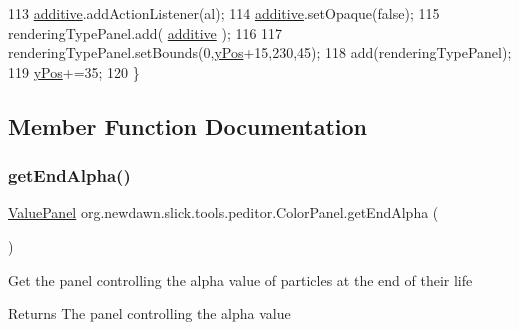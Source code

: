 \begin{DoxyCode}
113         \mbox{\hyperlink{classorg_1_1newdawn_1_1slick_1_1tools_1_1peditor_1_1_color_panel_a538f6d62e19f00dbbb4bed362005f783}{additive}}.addActionListener(al);
114         \mbox{\hyperlink{classorg_1_1newdawn_1_1slick_1_1tools_1_1peditor_1_1_color_panel_a538f6d62e19f00dbbb4bed362005f783}{additive}}.setOpaque(\textcolor{keyword}{false});
115         renderingTypePanel.add( \mbox{\hyperlink{classorg_1_1newdawn_1_1slick_1_1tools_1_1peditor_1_1_color_panel_a538f6d62e19f00dbbb4bed362005f783}{additive}} );
116         
117         renderingTypePanel.setBounds(0,\mbox{\hyperlink{classorg_1_1newdawn_1_1slick_1_1tools_1_1peditor_1_1_control_panel_a3d5996be7856b645ae7a1288ce688623}{yPos}}+15,230,45);
118         add(renderingTypePanel);
119         \mbox{\hyperlink{classorg_1_1newdawn_1_1slick_1_1tools_1_1peditor_1_1_control_panel_a3d5996be7856b645ae7a1288ce688623}{yPos}}+=35;
120     \}
\end{DoxyCode}


\subsection{Member Function Documentation}
\mbox{\label{classorg_1_1newdawn_1_1slick_1_1tools_1_1peditor_1_1_color_panel_a98d17b9376493d11742c2365b25d8114}} 
\subsubsection{\texorpdfstring{get\+End\+Alpha()}{getEndAlpha()}}
{\footnotesize\ttfamily \mbox{\hyperlink{classorg_1_1newdawn_1_1slick_1_1tools_1_1peditor_1_1_value_panel}{Value\+Panel}} org.\+newdawn.\+slick.\+tools.\+peditor.\+Color\+Panel.\+get\+End\+Alpha (\begin{DoxyParamCaption}{ }\end{DoxyParamCaption})\hspace{0.3cm}{\ttfamily [inline]}}

Get the panel controlling the alpha value of particles at the end of their life

\begin{DoxyReturn}{Returns}
The panel controlling the alpha value 
\end{DoxyReturn}


